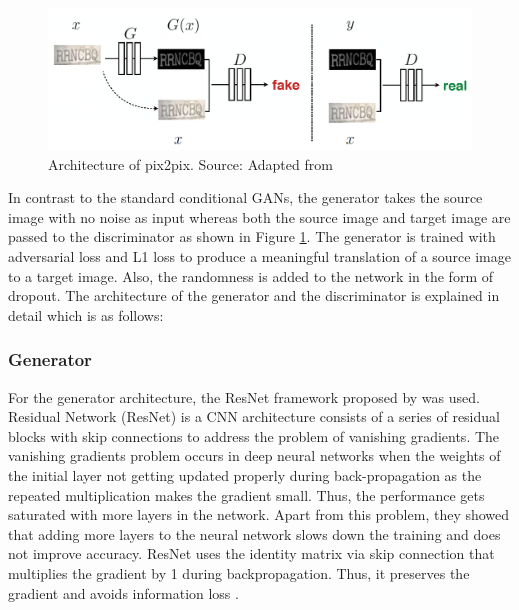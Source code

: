 \begin{figure}[H]
\centering
\includegraphics[width=5in]{images/pix2pix.png}
\caption[Architecture of pix2pix]{Architecture of pix2pix. Source: Adapted from \citep{isola2017image}}
\label{fig:pix}
\end{figure}

In contrast to the standard conditional GANs, the generator takes the source image with no noise as input whereas both the source image and target image are passed to the discriminator as shown in Figure \ref{fig:pix}. The generator is trained with adversarial loss and L1 loss to produce a meaningful translation of a source image to a target image. Also, the randomness is added to the network in the form of dropout. The architecture of the generator and the discriminator is explained in detail which is as follows:

\subsubsection*{Generator}

	For the generator architecture, the ResNet framework proposed by \citeauthor{he2016deep} was used. Residual Network (ResNet) is a CNN architecture consists of a series of residual blocks with skip connections to address the problem of vanishing gradients. The vanishing gradients problem occurs in deep neural networks when the weights of the initial layer not getting updated properly during back-propagation as the repeated multiplication makes the gradient small. Thus, the performance gets saturated with more layers in the network. Apart from this problem, they showed that adding more layers to the neural network slows down the training and does not improve accuracy. ResNet uses the identity matrix via skip connection that multiplies the gradient by 1 during backpropagation. Thus, it preserves the gradient and avoids information loss \citep{he2016deep,resnet}. 

